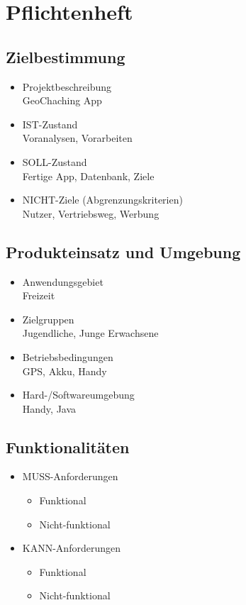 \section{Pflichtenheft}
\subsection{Zielbestimmung}
\begin{itemize}
	\item Projektbeschreibung \\
	GeoChaching App
	\item IST-Zustand\\
	Voranalysen, Vorarbeiten
	\item SOLL-Zustand\\
	Fertige App, Datenbank, Ziele
	\item NICHT-Ziele (Abgrenzungskriterien)\\
	Nutzer, Vertriebsweg, Werbung
\end{itemize}
\subsection{Produkteinsatz und Umgebung}
\begin{itemize}
	\item Anwendungsgebiet\\
	Freizeit
	\item Zielgruppen\\
	Jugendliche, Junge Erwachsene
	\item Betriebsbedingungen\\
	GPS, Akku, Handy
	\item Hard-/Softwareumgebung\\
	Handy, Java
\end{itemize}
\subsection{Funktionalitäten}
\begin{itemize}
	\item MUSS-Anforderungen
	\begin{itemize}
		\item Funktional
		\item Nicht-funktional
	\end{itemize}
	\item KANN-Anforderungen
	\begin{itemize}
		\item Funktional
		\item Nicht-funktional
	\end{itemize}
\end{itemize}
